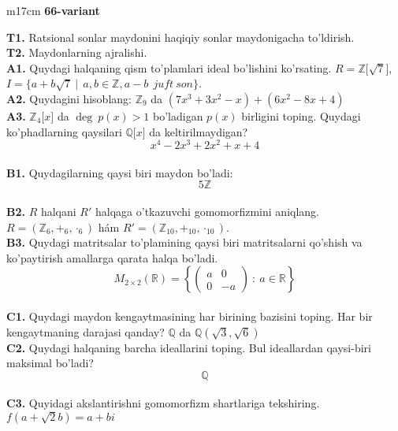\documentclass{article}
\begin{document}
\begin{tabular}{m{17cm}}
\textbf{66-variant}
\newline

\textbf{T1.} Ratsional sonlar maydonini haqiqiy sonlar maydonigacha to'ldirish. \\
\textbf{T2.} Maydonlarning ajralishi. \\
\textbf{A1.} Quydagi halqaning qism to'plamlari ideal bo'lishini ko'rsating.
\(R\mathbb{= Z\lbrack}\sqrt{7}\rbrack\), \(I = \{ a + b\sqrt{7}\ |\ \ a,b \in \mathbb{Z,}a - b\ \ juft\ son\}\). \\
\textbf{A2.} Quydagini hisoblang:
\(\mathbb{Z}_{9}\) da \(\left( 7x^{3} + 3x^{2} - x \right) + \left( 6x^{2} - 8x + 4 \right)\) \\
\textbf{A3.} \(\mathbb{Z}_{4}\lbrack x\rbrack\) da \(\deg\ p(x) > 1\) bo'ladigan \(p(x)\) birligini toping. Quydagi ko'phadlarning qaysilari \(\mathbb{Q\lbrack}x\rbrack\) da keltirilmaydigan?
\[x^{4} - 2x^{3} + 2x^{2} + x + 4\] \\
\textbf{B1.} Quydagilarning qaysi biri maydon bo'ladi:
\[5\mathbb{Z}\] \\
\textbf{B2.} \(R\) halqani \(R'\) halqaga o'tkazuvchi gomomorfizmini aniqlang.
\(R = (\mathbb{Z}_{6}, +_{6}, \cdot_{6})\) hám \(R' = (\mathbb{Z}_{10}, +_{10}, \cdot_{10})\). \\
\textbf{B3.} Quydagi matritsalar to'plamining qaysi biri matritsalarni qo'shish va ko'paytirish amallarga qarata halqa bo'ladi.
\[M_{2 \times 2}\mathbb{(R) =}\left\{ \begin{pmatrix}
a & 0 \\
0 & - a
\end{pmatrix}\ :\ a \in \mathbb{R} \right\}\] \\
\textbf{C1.} Quydagi maydon kengaytmasining har birining bazisini toping. Har bir kengaytmaning darajasi qanday?
\(\mathbb{Q}\) da \(\mathbb{Q}\left( \sqrt{3},\sqrt{6} \right)\) \\
\textbf{C2.} Quydagi halqaning barcha ideallarini toping. Bul ideallardan qaysi-biri maksimal bo'ladi?
\[\mathbb{Q}\] \\
\textbf{C3.} Quyidagi akslantirishni gomomorfizm shartlariga tekshiring. \(f\left( a + \sqrt{2}b \right) = a + bi\) \\

\end{tabular}
\vspace{1cm}
\end{document}
